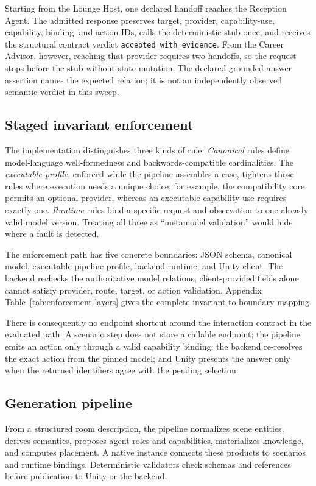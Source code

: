 Starting from the Lounge Host, one declared handoff reaches the Reception
Agent. The admitted response preserves target, provider, capability-use,
capability, binding, and action IDs, calls the deterministic stub once, and
receives the structural contract verdict \texttt{accepted\_with\_evidence}.
From the Career Advisor, however, reaching that provider requires two handoffs,
so the request stops before the stub without state mutation. The declared
grounded-answer assertion names the expected relation; it is not an
independently observed semantic verdict in this sweep.

\subsection{Staged invariant enforcement}

The implementation distinguishes three kinds of rule. \emph{Canonical} rules
define model-language well-formedness and backwards-compatible cardinalities.
The \emph{executable profile}, enforced while the pipeline assembles a case,
tightens those rules where execution needs a unique choice; for example, the
compatibility core permits an optional provider, whereas an executable
capability use requires exactly one. \emph{Runtime} rules bind a
specific request and observation to one already valid model version. Treating
all three as ``metamodel validation'' would hide where a fault is detected.

The enforcement path has five concrete boundaries: JSON schema, canonical
model, executable pipeline profile, backend runtime, and Unity client. The
backend rechecks the authoritative model relations; client-provided fields
alone cannot satisfy provider, route, target, or action validation. Appendix
Table~\ref{tab:enforcement-layers} gives the complete invariant-to-boundary
mapping.

There is consequently no endpoint shortcut around the interaction contract in
the evaluated path. A scenario step does not store a callable endpoint; the
pipeline emits an action only through a valid capability binding; the backend
re-resolves the exact action from the pinned model; and Unity presents the
answer only when the returned identifiers agree with the pending selection.

\subsection{Generation pipeline}

From a structured room description, the pipeline normalizes scene entities,
derives semantics, proposes agent roles and capabilities, materializes
knowledge, and computes placement. A native \systemname{} instance connects
these products to scenarios and runtime bindings. Deterministic validators
check schemas and references before publication to Unity or the backend.

